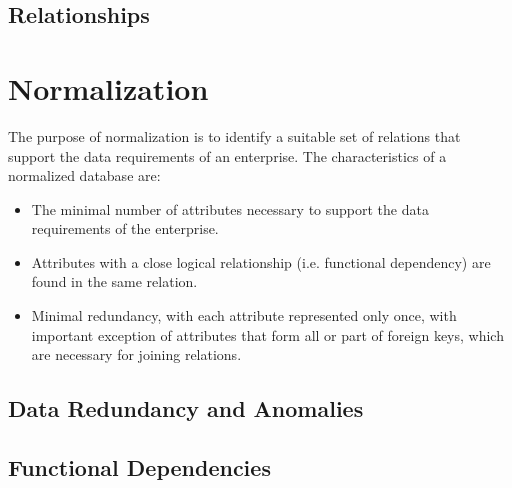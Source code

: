 \documentclass[12pt letter]{report}
\begin{document}
\section{Relationships}


\begin{figure}[htpb]
  \centering
\end{figure}

\chapter{Normalization}


The purpose of normalization is to identify a suitable set of relations that support the data requirements of an
enterprise. The characteristics of a normalized database are:
\begin{itemize}
  \item The minimal number of attributes necessary to support the data requirements of the enterprise.
  \item Attributes with a close logical relationship (i.e. functional dependency) are found in the same relation.
  \item Minimal redundancy, with each attribute represented only once, with important exception of attributes that form
        all or part of foreign keys, which are necessary for joining relations.
\end{itemize}

\section{Data Redundancy and Anomalies}

\section{Functional Dependencies}
\end{document}
